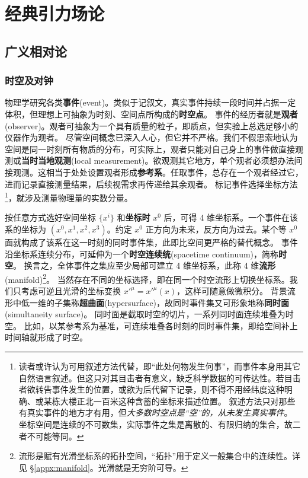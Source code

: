 \chapter{经典引力场论}

\section{广义相对论}
\subsection{时空及对钟}

物理学研究各类\textbf{事件}(event)。类似于记叙文，真实事件持续一段时间并占据一定体积，但理想上可抽象为时刻、空间点所构成的\textbf{时空点}。
事件的经历者就是\textbf{观者}(observer)。观者可抽象为一个具有质量的粒子，即质点，但实验上总选足够小的仪器作为观者。
尽管空间概念已深入人心，但它并不严格。我们不假思索地认为空间是同一时刻所有物质的分布，可实际上，观者只能对自己身上的事件做直接观测或\textbf{当时当地观测}(local measurement)。欲观测其它地方，单个观者必须想办法间接观测。这相当于处处设置观者形成\textbf{参考系}。任取事件，总存在一个观者经过它，进而记录直接测量结果，后续视需求再传递给其余观者。
标记事件选择坐标方法\footnote{读者或许认为可用叙述方法代替，即“此处何物发生何事”，而事件本身用其它自然语言叙述。但这只对其目击者有意义，缺乏科学数据的可传达性。若目击者欲转告事件发生的位置，或欲为后代留下记录，则不得不用经纬度这种明确、或某栋大楼正北一百米这种含蓄的坐标来描述位置。
叙述方法只对那些有真实事件的地方才有用，但\emph{大多数时空点是“空”的，从未发生真实事件}。
坐标空间是连续的不可数集，实际事件之集是离散的、有限归纳的集合，故二者不可能等同。}，就涉及测量物理量的实数分量。

按任意方式选好空间坐标 $\{x^i\}$ 和\textbf{坐标时} $x^0$ 后，可得 4 维坐标系。一个事件在该系的坐标为 $(x^0,x^1,x^2,x^3)$。约定 $x^0$ 正方向为未来，反方向为过去。某个等 $x^0$ 面就构成了该系在这一时刻的同时事件集，此即比空间更严格的替代概念。
事件沿坐标系连续分布，可延伸为一个\textbf{时空连续统}(spacetime continuum)，简称\textbf{时空}。
换言之，全体事件之集应至少局部可建立 4 维坐标系，此称 4 维\textbf{流形}(manifold)\footnote{流形是赋有光滑坐标系的拓扑空间，“拓扑”用于定义一般集合中的连续性。详见 \S\ref{appx:manifold}。光滑就是无穷阶可导。}。
当然存在不同的坐标选择，即在同一个时空流形上切换坐标系。我们只考虑可逆且光滑的坐标变换 $x'^\mu=x'^\mu(x)$，这样可随意做微积分。
背景流形中低一维的子集称\textbf{超曲面}(hypersurface)，故同时事件集又可形象地称\textbf{同时面}(simultaneity surface)。
同时面是截取时空的切片，一系列同时面连续堆叠为时空。
比如，以某参考系为基准，可连续堆叠各时刻的同时事件集，即给空间补上时间轴就形成了时空。

